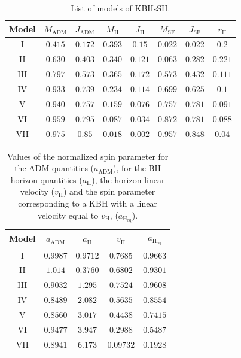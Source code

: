 \documentclass[twocolumn,aps,showpacs,showkeys,prd,superscriptaddress,byrevtex, amsmath]{revtex4-1}
\begin{document}
\begin{table}
\caption{List of models of KBHsSH.}        
\label{models_list}      
\centering          
\begin{tabular}{c c c c  c c c c}
\hline\hline       
 Model & $M_{\mathrm{ADM}}$ & $J_{\mathrm{ADM}}$ & $M_{\mathrm{H}}$ &  $J_{\mathrm{H}}$ & $M_{\mathrm{SF}}$ & $J_{\mathrm{SF}}$ & $r_{\mathrm{H}}$ \\ 
\hline           
I & $0.415$ & $0.172$ & $0.393$ &  $0.15$  & $0.022$ & $0.022$ & $0.2$\\ 
 \hline 
II & $0.630$ & $0.403$ & $0.340$ &  $0.121$  & $0.063$ & $0.282$ & $0.221$ \\
 \hline 
III & $0.797$ & $0.573$ & $0.365$ &  $0.172$  & $0.573$ & $0.432$ & $0.111$ \\ 
 \hline 
IV & $0.933$ & $0.739$ & $0.234$ &  $0.114$  & $0.699$ & $0.625$ & $0.1$ \\ 
 \hline 
V & $0.940$ & $0.757$ & $0.159$ &  $0.076$  & $0.757$ & $0.781$ & $0.091$ \\ 
 \hline 
VI & $0.959$ & $0.795$ & $0.087$ &  $0.034$  & $0.872$ & $0.781$ & $0.088$ \\ 
 \hline 
VII & $0.975$ & $0.85$ & $0.018$ &  $0.002$  & $0.957$ & $0.848$ & $0.04$ \\ 
\hline      
\end{tabular}
\end{table}

\begin{table}
\caption{Values of the normalized spin parameter for the ADM quantities ($a_{\mathrm{ADM}}$), for the BH horizon quantities ($a_{\mathrm{H}}$), the horizon linear velocity ($v_{\mathrm{H}}$) and the spin parameter corresponding to a KBH with a linear velocity equal to $v_{\mathrm{H}}$, ($a_{\mathrm{H_{eq}}}$).}        
\label{models_spin_vel}      
\centering          
\begin{tabular}{c c c c c}
\hline\hline       
 Model & $a_{\mathrm{ADM}}$ & $a_{\mathrm{H}}$ & $v_{\mathrm{H}}$ & $a_{\mathrm{H_{eq}}}$ \\ 
\hline           
I & $0.9987$ & $0.9712$ & $0.7685$ & $0.9663$ \\ 
 \hline 
II & $1.014$ & $0.3760$ & $0.6802$ & $0.9301$ \\
 \hline 
III & $0.9032$ & $1.295$ & $0.7524$ & $0.9608$ \\ 
 \hline 
IV & $0.8489$ & $2.082$ & $0.5635$ & $0.8554$ \\ 
 \hline 
V & $0.8560$ & $3.017$ & $0.4438$ & $0.7415$ \\ 
 \hline 
VI & $0.9477$ & $3.947$ & $0.2988$ & $0.5487$ \\ 
 \hline 
VII & $0.8941$ & $6.173$ & $0.09732$ & $0.1928$ \\ 
\hline      
\end{tabular}
\end{table}
\end{document}
